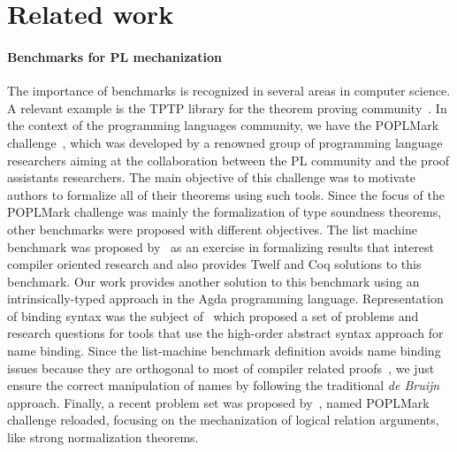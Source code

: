 \documentclass[sigconf]{acmart}
\theoremstyle{definition}
\begin{document}
\section{Related work}\label{sec:related}

\paragraph{Benchmarks for PL mechanization}{
The importance of benchmarks is recognized in several areas in computer science. A relevant example is the
TPTP library for the theorem proving community~\cite{Sut17}. In the context of the programming languages community,
we have the POPLMark challenge~\cite{Aydemir05}, which was developed by a renowned group of programming language researchers aiming
at the collaboration between the PL community and the proof assistants researchers. The main objective of this challenge
was to motivate authors to formalize all of their theorems using such tools. Since the focus of the POPLMark challenge
was mainly the formalization of type soundness theorems, other benchmarks were proposed with different objectives. The list
machine benchmark was proposed by~\citet{Appel07} as an exercise in formalizing results that interest
compiler oriented research and also provides Twelf and Coq solutions to this benchmark. Our work provides another
solution to this benchmark using an intrinsically-typed approach in the Agda programming language. Representation of binding syntax
was the subject of~\citet{FeltyMP18} which proposed a set of problems and research questions for tools
that use the high-order abstract syntax approach for name binding. Since the list-machine benchmark definition avoids
name binding issues because they are orthogonal to most of compiler related proofs~\cite{Appel07}, we just ensure
the correct manipulation of names by following the traditional \emph{de Bruijn} approach. Finally, a recent problem set
was proposed by~\citet{Pientka18}, named POPLMark challenge reloaded, focusing on the mechanization
of logical relation arguments, like strong normalization theorems.}
\end{document}
